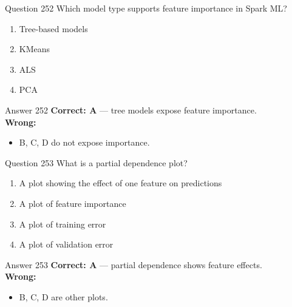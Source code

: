 \documentclass[aspectratio=169,11pt]{beamer}
\begin{document}
	\begin{frame}{Question 252}
		Which model type supports feature importance in Spark ML?
		\begin{enumerate}[label=\Alph*.]
			\item Tree-based models
			\item KMeans
			\item ALS
			\item PCA
		\end{enumerate}
	\end{frame}
	\begin{frame}{Answer 252}
		\textbf{Correct: A} --- tree models expose feature importance.\\
		\vspace{0.5em}
		\textbf{Wrong:}
		\begin{itemize}
			\item B, C, D do not expose importance.
		\end{itemize}
	\end{frame}
	
	\begin{frame}{Question 253}
		What is a partial dependence plot?
		\begin{enumerate}[label=\Alph*.]
			\item A plot showing the effect of one feature on predictions
			\item A plot of feature importance
			\item A plot of training error
			\item A plot of validation error
		\end{enumerate}
	\end{frame}
	\begin{frame}{Answer 253}
		\textbf{Correct: A} --- partial dependence shows feature effects.\\
		\vspace{0.5em}
		\textbf{Wrong:}
		\begin{itemize}
			\item B, C, D are other plots.
		\end{itemize}
	\end{frame}
	
\end{document}
